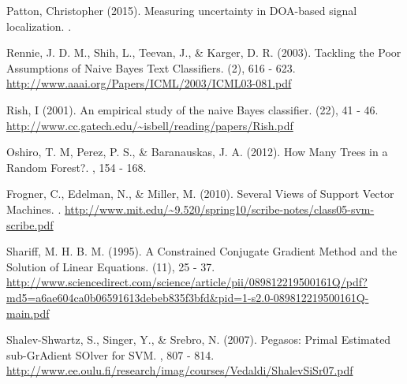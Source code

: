 \documentclass[twoside]{article}
\begin{document}

\begin{thebibliography}{99} %

Patton, Christopher (2015).
\newblock Measuring uncertainty in DOA-based signal localization.
.

Rennie, J. D. M., Shih, L., Teevan, J., \& Karger, D. R. (2003).
\newblock Tackling the Poor Assumptions of Naive Bayes Text Classifiers.
(2), 616 - 623. 
\url{http://www.aaai.org/Papers/ICML/2003/ICML03-081.pdf}
\href{http://www.aaai.org/Papers/ICML/2003/ICML03-081.pdf}{}
 
Rish, I (2001).
\newblock An empirical study of the naive Bayes classifier.
(22), 41 - 46. 
\url{http://www.cc.gatech.edu/~isbell/reading/papers/Rish.pdf}
\href{http://www.cc.gatech.edu/~isbell/reading/papers/Rish.pdf}{}

Oshiro, T. M, Perez, P. S., \& Baranauskas, J. A. (2012).
\newblock How Many Trees in a Random Forest?.
, 154 - 168. 

Frogner, C., Edelman, N., \& Miller, M. (2010).
\newblock Several Views of Support Vector Machines.
. 
\url{http://www.mit.edu/~9.520/spring10/scribe-notes/class05-svm-scribe.pdf}
\href{http://www.mit.edu/~9.520/spring10/scribe-notes/class05-svm-scribe.pdf}{}

Shariff, M. H. B. M. (1995).
\newblock A Constrained Conjugate Gradient Method and the Solution of Linear Equations.
(11), 25 - 37. 
\url{http://www.sciencedirect.com/science/article/pii/089812219500161Q/pdf?md5=a6ae604ca0b06591613debeb835f3bfd&pid=1-s2.0-089812219500161Q-main.pdf}
\href{http://www.sciencedirect.com/science/article/pii/089812219500161Q/pdf?md5=a6ae604ca0b06591613debeb835f3bfd&pid=1-s2.0-089812219500161Q-main.pdf}{}

 Shalev-Shwartz, S., Singer, Y., \& Srebro, N. (2007).
\newblock Pegasos: Primal Estimated sub-GrAdient SOlver for SVM.
, 807 - 814. 
\url{http://www.ee.oulu.fi/research/imag/courses/Vedaldi/ShalevSiSr07.pdf}
\href{http://www.ee.oulu.fi/research/imag/courses/Vedaldi/ShalevSiSr07.pdf}{}


\end{thebibliography}
\end{document}
